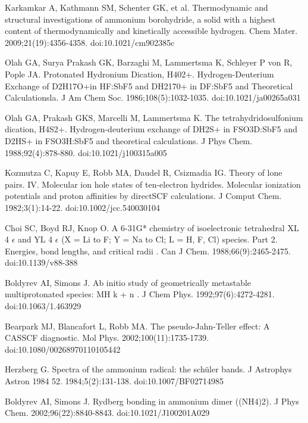 \documentclass[12pt]{report}
\begin{document}
\newpage
{}
\begin{thebibliography}{13}
	Karkamkar A, Kathmann SM, Schenter GK, et al. Thermodynamic and structural investigations of ammonium borohydride, a solid with a highest content of thermodynamically and kinetically accessible hydrogen. Chem Mater. 2009;21(19):4356-4358. doi:10.1021/cm902385c
 
  Olah GA, Surya Prakash GK, Barzaghi M, Lammertsma K, Schleyer P von R, Pople JA. Protonated Hydronium Dication, H402+. Hydrogen-Deuterium Exchange of D2H17O+in HF:SbF5 and DH2170+ in DF:SbF5 and Theoretical Calculationsla. J Am Chem Soc. 1986;108(5):1032-1035. doi:10.1021/ja00265a031 

 
 	Olah GA, Prakash GKS, Marcelli M, Lammertsma K. The tetrahydridosulfonium dication, H4S2+. Hydrogen-deuterium exchange of DH2S+ in FSO3D:SbF5 and D2HS+ in FSO3H:SbF5 and theoretical calculations. J Phys Chem. 1988;92(4):878-880. doi:10.1021/j100315a005


  Kozmutza C, Kapuy E, Robb MA, Daudel R, Csizmadia IG. Theory of lone pairs. IV. Molecular ion hole states of ten-electron hydrides. Molecular ionization potentials and proton affinities by directSCF calculations. J Comput Chem. 1982;3(1):14-22. doi:10.1002/jcc.540030104

  Choi SC, Boyd RJ, Knop O.  A 6-31G* chemistry of isoelectronic tetrahedral XL 4 $\epsilon$ and YL 4 $\epsilon$ (X = Li to F; Y = Na to Cl; L = H, F, Cl) species. Part 2. Energies, bond lengths, and critical radii . Can J Chem. 1988;66(9):2465-2475. doi:10.1139/v88-388

  Boldyrev AI, Simons J. Ab initio study of geometrically metastable multiprotonated species: MH  k +   n . J Chem Phys. 1992;97(6):4272-4281. doi:10.1063/1.463929


  Bearpark MJ, Blancafort L, Robb MA. The pseudo-Jahn-Teller effect: A CASSCF diagnostic. Mol Phys. 2002;100(11):1735-1739. doi:10.1080/00268970110105442

  	Herzberg G. Spectra of the ammonium radical: the schüler bands. J Astrophys Astron 1984 52. 1984;5(2):131-138. doi:10.1007/BF02714985

 	Boldyrev AI, Simons J. Rydberg bonding in ammonium dimer ((NH4)2). J Phys Chem. 2002;96(22):8840-8843. doi:10.1021/J100201A029


\end{thebibliography}
\end{document}
